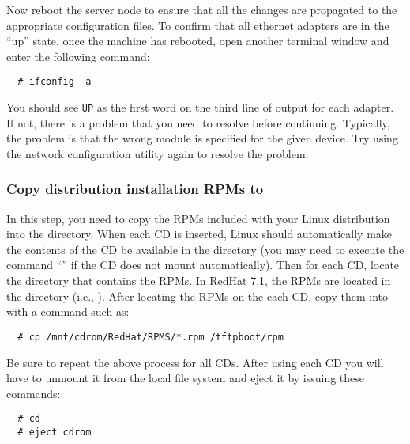 \endchange

Now reboot the server node to ensure that all the changes are
propagated to the appropriate configuration files. To confirm that all
ethernet adapters are in the ``up'' state, once the machine has
rebooted, open another terminal window and enter the following
command:

\begin{verbatim}
  # ifconfig -a
\end{verbatim}
  
You should see {\tt UP} as the first word on the third line of output
for each adapter. If not, there is a problem that you need to resolve
before continuing. Typically, the problem is that the wrong module is
specified for the given device. Try using the network configuration
utility again to resolve the problem.
  

\subsubsection{Copy distribution installation RPMs to }
\label{det:rpmcopy}

In this step, you need to copy the RPMs included with your Linux
distribution into the  directory.  When each CD is
inserted, Linux should automatically make the contents of the CD be
available in the  directory (you may need to execute
the command ``'' if the CD does not mount
automatically).  Then for each CD, locate the directory that contains
the RPMs.  In RedHat 7.1, the RPMs are located in the
 directory (i.e., ).
After locating the RPMs on the each CD, copy them into
 with a command such as:

\begin{verbatim}
  # cp /mnt/cdrom/RedHat/RPMS/*.rpm /tftpboot/rpm
\end{verbatim}
  
Be sure to repeat the above process for all CDs.  After using each CD
you will have to unmount it from the local file system and eject it by
issuing these commands:

\begin{verbatim}
  # cd
  # eject cdrom
\end{verbatim}



